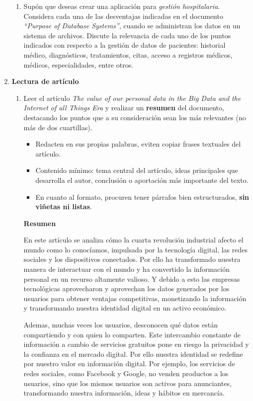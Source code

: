 \documentclass[12pt]{report}
\begin{document}
\begin{enumerate}[label=\textbf{\arabic*.}, leftmargin=*]
\begin{enumerate}[label=\textbf{\alph*.}, leftmargin=*, itemsep=1.0em]
\item Sup\'on que deseas crear una aplicaci\'on para \textit{gesti\'on hospitalaria}. Considera cada una de las desventajas indicadas en el documento \textit{``Purpose of Database Systems''}, cuando se administran los datos en un sistema de archivos. Discute la relevancia de cada uno de los puntos indicados con respecto a la gesti\'on de datos de pacientes: historial m\'edico, diagn\'osticos, tratamientos, citas, acceso a registros m\'edicos, m\'edicos, especialidades, entre otros.
\end{enumerate}
\newpage
\item \textbf{Lectura de art\'iculo}

\begin{enumerate}[label=\textbf{\alph*.}, leftmargin=*, itemsep=1.0em]

\item Leer el art\'iculo \textit{The value of our personal data in the Big Data and the Internet of all Things Era} y realizar un \textbf{resumen} del documento, destacando los puntos que a su consideraci\'on sean los m\'as relevantes (no m\'as de dos cuartillas).
\begin{itemize}
  \item Redacten en sus propias palabras, eviten copiar frases textuales del art\'iculo.
  \item Contenido m\'inimo: tema central del art\'iculo, ideas principales que desarrolla el autor, conclusi\'on o aportaci\'on m\'as importante del texto.
  \item En cuanto al formato, procuren tener p\'arrafos bien estructurados, \textbf{sin vi\~netas ni listas}.
\end{itemize}

\textbf{Resumen}

En este artículo se analiza cómo la cuarta revolución industrial afecto el mundo como lo conocíamos, impulsada por la tecnología digital, las redes sociales y los dispositivos conectados. Por ello ha transformado nuestra manera de interactuar con el mundo y ha convertido la información personal en un recurso altamente valioso. Y debido a esto las empresas tecnológicas aprovecharon y aprovechan los datos generados por los usuarios para obtener ventajas competitivas, monetizando la información y transformando nuestra identidad digital en un activo económico.

Ademas, muchas veces los usuarios, desconocen qué datos están compartiendo y con quien lo comparten. Este intercambio constante de información a cambio de servicios gratuitos pone en riesgo la privacidad y la confianza en el mercado digital. 
Por ello nuestra identidad se redefine por nuestro valor en información digital. Por ejemplo, los servicios de redes sociales, como Facebook y Google, no venden productos a los usuarios, sino que los mismos usuarios son activos para anunciantes, transformando nuestra información, ideas y hábitos en mercancía.


\end{enumerate}
\end{enumerate}
\end{document}

